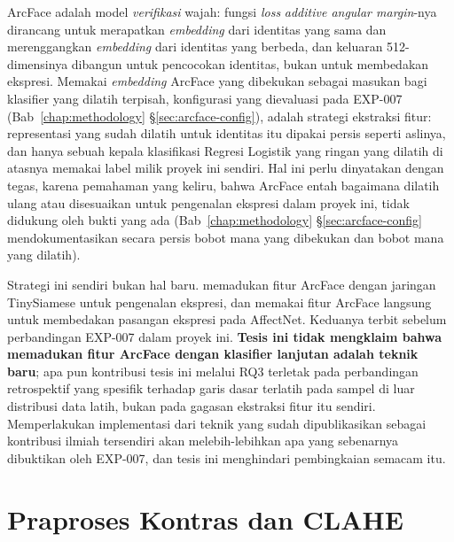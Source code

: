 ArcFace \citep{deng2019arcface} adalah model \emph{verifikasi} wajah: fungsi \textit{loss} \textit{additive angular margin}-nya dirancang untuk merapatkan \textit{embedding} dari identitas yang sama dan merenggangkan \textit{embedding} dari identitas yang berbeda, dan keluaran 512-dimensinya dibangun untuk pencocokan identitas, bukan untuk membedakan ekspresi. Memakai \textit{embedding} ArcFace yang dibekukan sebagai masukan bagi klasifier yang dilatih terpisah, konfigurasi yang dievaluasi pada EXP-007 (Bab~\ref{chap:methodology} \S\ref{sec:arcface-config}), adalah strategi ekstraksi fitur: representasi yang sudah dilatih untuk identitas itu dipakai persis seperti aslinya, dan hanya sebuah kepala klasifikasi Regresi Logistik yang ringan yang dilatih di atasnya memakai label milik proyek ini sendiri. Hal ini perlu dinyatakan dengan tegas, karena pemahaman yang keliru, bahwa ArcFace entah bagaimana dilatih ulang atau disesuaikan untuk pengenalan ekspresi dalam proyek ini, tidak didukung oleh bukti yang ada (Bab~\ref{chap:methodology} \S\ref{sec:arcface-config} mendokumentasikan secara persis bobot mana yang dibekukan dan bobot mana yang dilatih).

Strategi ini sendiri bukan hal baru. \citet{altaha2023facial} memadukan fitur ArcFace dengan jaringan TinySiamese untuk pengenalan ekspresi, dan \citet{waldner2024pairwise} memakai fitur ArcFace langsung untuk membedakan pasangan ekspresi pada AffectNet. Keduanya terbit sebelum perbandingan EXP-007 dalam proyek ini. \textbf{Tesis ini tidak mengklaim bahwa memadukan fitur ArcFace dengan klasifier lanjutan adalah teknik baru}; apa pun kontribusi tesis ini melalui RQ3 terletak pada perbandingan retrospektif yang spesifik terhadap garis dasar terlatih pada sampel di luar distribusi data latih, bukan pada gagasan ekstraksi fitur itu sendiri. Memperlakukan implementasi dari teknik yang sudah dipublikasikan sebagai kontribusi ilmiah tersendiri akan melebih-lebihkan apa yang sebenarnya dibuktikan oleh EXP-007, dan tesis ini menghindari pembingkaian semacam itu.

\section{Praproses Kontras dan CLAHE}

